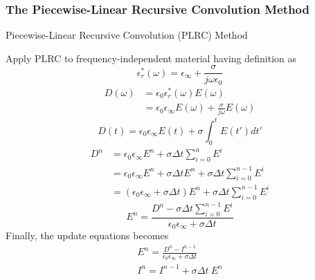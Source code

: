 \subsubsection{The Piecewise-Linear Recursive Convolution Method}
Piecewise-Linear Recursive Convolution (PLRC) Method

Apply PLRC to frequency-independent material having definition as
\begin{displaymath}
  \epsilon_r^{*}(\omega) = \epsilon_{\infty} + \frac{\sigma}{j \omega \epsilon_0}
\end{displaymath}
\begin{displaymath}
  \begin{split}
    D(\omega) & = \epsilon_0 \epsilon_r^{*}(\omega) E(\omega)\\
    & = \epsilon_0 \epsilon_{\infty} E(\omega) + \frac{\sigma}{j\omega}E(\omega)
  \end{split}
\end{displaymath}
\begin{displaymath}
  D(t) = \epsilon_0 \epsilon_{\infty}E(t) + \sigma \int_0^t E(t')dt'
\end{displaymath}
\begin{displaymath}
  \begin{split}
    D^n & = \epsilon_0 \epsilon_{\infty} E^n + \sigma \Delta t \sum_{i=0}^{n}E^i\\
    & = \epsilon_0 \epsilon_{\infty} E^n + \sigma \Delta t E^n + \sigma \Delta t \sum_{i=0}^{n-1}E^i\\
    & = (\epsilon_0 \epsilon_{\infty} + \sigma \Delta t) E^n + \sigma \Delta t \sum_{i=0}^{n-1}E^i
  \end{split}
\end{displaymath}
\begin{displaymath}
  E^n = \frac{\displaystyle D^n - \sigma \Delta t \sum_{i=0}^{n-1}E^i}{\epsilon_0 \epsilon_{\infty} + \sigma \Delta t}
\end{displaymath}
Finally, the update equations becomes
\begin{gather*}
  E^n = \frac{D^n - I^{n-1}}{\epsilon_0 \epsilon_{\infty} + \sigma \Delta t}\\
  I^n = I^{n-1} + \sigma \Delta t\ E^n
\end{gather*}

